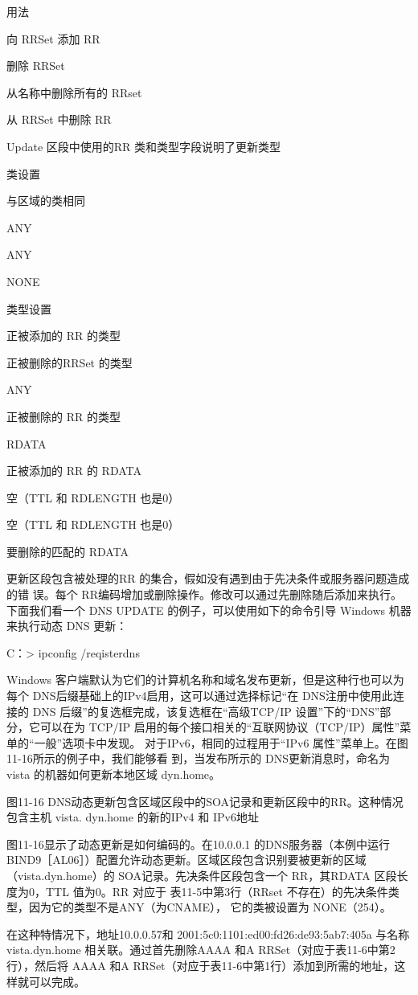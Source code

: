 用法

向 RRSet 添加 RR

删除 RRSet

从名称中删除所有的 RRset

从 RRSet 中删除 RR

Update 区段中使用的RR 类和类型字段说明了更新类型

类设置

与区域的类相同

ANY

ANY

NONE

类型设置

正被添加的 RR 的类型

正被删除的RRSet 的类型

ANY

正被删除的 RR 的类型

RDATA

正被添加的 RR 的 RDATA

空（TTL 和 RDLENGTH 也是0）

空（TTL 和 RDLENGTH 也是0）

要删除的匹配的 RDATA

更新区段包含被处理的RR 的集合，假如没有遇到由于先决条件或服务器问题造成的错
误。每个 RR编码增加或删除操作。修改可以通过先删除随后添加来执行。下面我们看一个
DNS UPDATE 的例子，可以使用如下的命令引导 Windows 机器来执行动态 DNS 更新：

C：> ipconfig /reqisterdns

Windows 客户端默认为它们的计算机名称和域名发布更新，但是这种行也可以为每个
DNS后缀基础上的IPv4启用，这可以通过选择标记“在 DNS注册中使用此连接的 DNS
后缀”的复选框完成，该复选框在“高级TCP/IP 设置”下的“DNS”部分，它可以在为
TCP/IP 启用的每个接口相关的“互联网协议（TCP/IP）属性”菜单的“一般”选项卡中发现。
对于IPv6，相同的过程用于“IPv6 属性”菜单上。在图11-16所示的例子中，我们能够看
到，当发布所示的 DNS更新消息时，命名为vista 的机器如何更新本地区域 dyn.home。

图11-16
DNS动态更新包含区域区段中的SOA记录和更新区段中的RR。这种情况包含主机 vista.
dyn.home 的新的IPv4 和 IPv6地址

图11-16显示了动态更新是如何编码的。在10.0.0.1 的DNS服务器（本例中运行
BIND9［AL06］）配置允许动态更新。区域区段包含识别要被更新的区域（vista.dyn.home）的
SOA记录。先决条件区段包含一个 RR，其RDATA 区段长度为0，TTL 值为0。RR 对应于
表11-5中第3行（RRset 不存在）的先决条件类型，因为它的类型不是ANY（为CNAME），
它的类被设置为 NONE（254）。

在这种特情况下，地址10.0.0.57和 2001:5c0:1101:ed00:fd26:de93:5ab7:405a 与名称
vista.dyn.home 相关联。通过首先删除AAAA 和A RRSet（对应于表11-6中第2行），然后将
AAAA 和A RRSet（对应于表11-6中第1行）添加到所需的地址，这样就可以完成。

